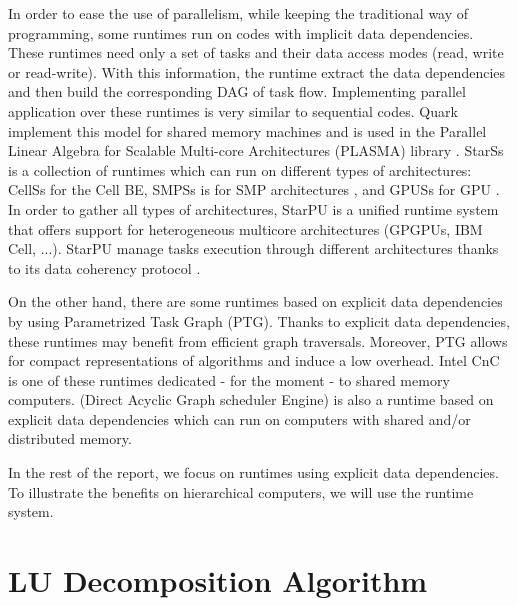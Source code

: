 In order to ease the use of parallelism, while keeping the traditional way of programming, some runtimes run on codes with implicit data dependencies. These runtimes need only a set of tasks and their data access modes (read, write or read-write). With this information, the runtime extract the data dependencies and then build the corresponding DAG of task flow. Implementing parallel application over these runtimes is very similar to sequential codes. Quark implement this model for shared memory machines and is used in the Parallel Linear Algebra for Scalable Multi-core Architectures (PLASMA) library \cite{1742-6596-180-1-012037}.
StarSs is a collection of runtimes which can run on different types of architectures: CellSs for the Cell BE\cite{Bellens06}, SMPSs is for SMP architectures \cite{journals/concurrency/BadiaHLPQQ09}, and GPUSs for GPU \cite{Ayguade09}. In order to gather all types of architectures, StarPU is a unified runtime system that offers support for heterogeneous multicore architectures (GPGPUs, IBM Cell, ...). StarPU manage tasks execution through different architectures thanks to its data coherency protocol \cite{DoBiBo07,journals/concurrency/AugonnetTNW11}.


On the other hand, there are some runtimes based on explicit data dependencies by using Parametrized Task Graph (PTG).
Thanks to explicit data dependencies, these runtimes may benefit from efficient graph traversals. Moreover, PTG allows for compact representations of algorithms and induce a low overhead. Intel CnC is one of these runtimes dedicated - for the moment - to shared memory computers. \dague (Direct Acyclic Graph scheduler Engine) is also a runtime based on explicit data dependencies which can run on computers with shared and/or distributed memory.

In the rest of the report, we focus on runtimes using explicit data dependencies. To illustrate the benefits on hierarchical computers, we will use the \dague runtime system. 

\section{LU Decomposition Algorithm}\label{lu_algo}
